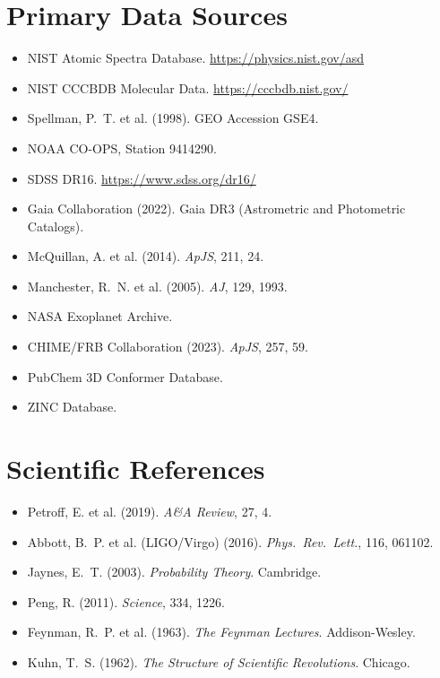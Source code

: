 \documentclass[11pt, letterpaper, openany]{book}
\begin{document}
\section*{Primary Data Sources}
\begin{itemize}
    \item NIST Atomic Spectra Database. \url{https://physics.nist.gov/asd}
    \item NIST CCCBDB Molecular Data. \url{https://cccbdb.nist.gov/}
    \item Spellman, P.~T. et al. (1998). GEO Accession GSE4.
    \item NOAA CO-OPS, Station 9414290.
    \item SDSS DR16. \url{https://www.sdss.org/dr16/}
    \item Gaia Collaboration (2022). Gaia DR3 (Astrometric and Photometric Catalogs).
    \item McQuillan, A. et al. (2014). \textit{ApJS}, 211, 24.
    \item Manchester, R.~N. et al. (2005). \textit{AJ}, 129, 1993.
    \item NASA Exoplanet Archive.
    \item CHIME/FRB Collaboration (2023). \textit{ApJS}, 257, 59.
    \item PubChem 3D Conformer Database.
    \item ZINC Database.
\end{itemize}

\section*{Scientific References}
\begin{itemize}
    \item Petroff, E. et al. (2019). \textit{A\&A Review}, 27, 4.
    \item Abbott, B.~P. et al. (LIGO/Virgo) (2016). \textit{Phys.~Rev.~Lett.}, 116, 061102.
    \item Jaynes, E.~T. (2003). \textit{Probability Theory}. Cambridge.
    \item Peng, R. (2011). \textit{Science}, 334, 1226.
    \item Feynman, R.~P. et al. (1963). \textit{The Feynman Lectures}. Addison-Wesley.
    \item Kuhn, T.~S. (1962). \textit{The Structure of Scientific Revolutions}. Chicago.
\end{itemize}
\clearpage

\end{document}
